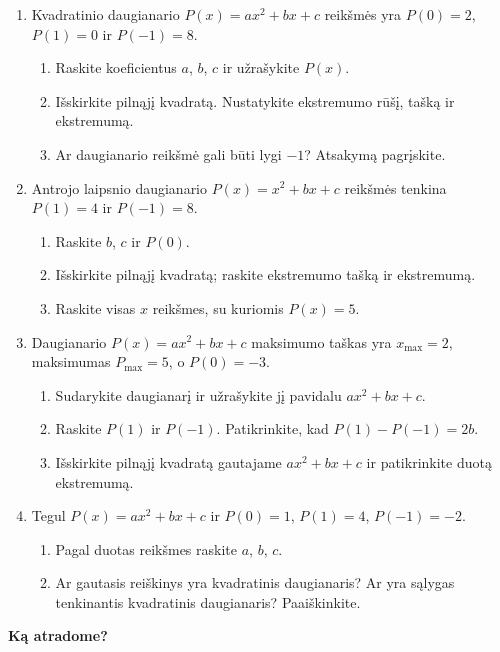 \documentclass[12pt,a4paper]{article}
\begin{document}
\begin{enumerate}
\begin{enumerate}
\item $x_{\min}=1$, $P_{\min}=2$, $P(3)=2$;
\item $x_{\min}=1$, $P_{\min}=2$, $P(1)=2$.
\end{enumerate}
Jei tinka daugiau nei vienas daugianaris, užrašykite juos visus.
\item Kvadratinio daugianario $P(x)=ax^2+bx+c$ reikšmės yra $P(0)=2$, $P(1)=0$ ir $P(-1)=8$.
\begin{enumerate}
\item Raskite koeficientus $a$, $b$, $c$ ir užrašykite $P(x)$.
\item Išskirkite pilnąjį kvadratą. Nustatykite ekstremumo rūšį, tašką ir ekstremumą.
\item Ar daugianario reikšmė gali būti lygi $-1$? Atsakymą pagrįskite.
\end{enumerate}
\item Antrojo laipsnio daugianario $P(x)=x^2+bx+c$ reikšmės tenkina $P(1)=4$ ir $P(-1)=8$.
\begin{enumerate}
\item Raskite $b$, $c$ ir $P(0)$.
\item Išskirkite pilnąjį kvadratą; raskite ekstremumo tašką ir ekstremumą.
\item Raskite visas $x$ reikšmes, su kuriomis $P(x)=5$.
\end{enumerate}
\item Daugianario $P(x)=ax^2+bx+c$ maksimumo taškas yra $x_{\max}=2$, maksimumas $P_{\max}=5$, o $P(0)=-3$.
\begin{enumerate}
\item Sudarykite daugianarį ir užrašykite jį pavidalu $ax^2+bx+c$.
\item Raskite $P(1)$ ir $P(-1)$. Patikrinkite, kad $P(1)-P(-1)=2b$.
\item Išskirkite pilnąjį kvadratą gautajame $ax^2+bx+c$ ir patikrinkite duotą ekstremumą.
\end{enumerate}
\item Tegul $P(x)=ax^2+bx+c$ ir $P(0)=1$, $P(1)=4$, $P(-1)=-2$.
\begin{enumerate}
\item Pagal duotas reikšmes raskite $a$, $b$, $c$.
\item Ar gautasis reiškinys yra kvadratinis daugianaris? Ar yra sąlygas tenkinantis kvadratinis daugianaris? Paaiškinkite.
\end{enumerate}
\end{enumerate}
\newpage
\begin{center}{\Large\bfseries Ką atradome?}\end{center}
\end{document}
